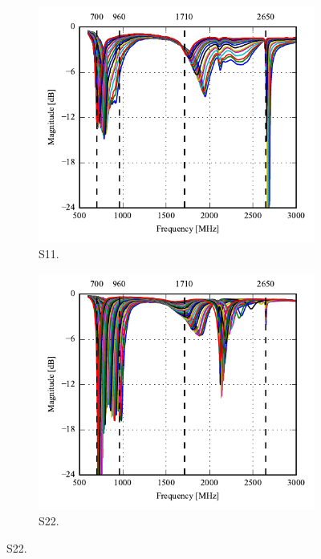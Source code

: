 \begin{figure}[htbp]
    \centering
    \begin{subfigure}{0.49\linewidth}
        \includegraphics{img/tech_sol/monopole/highband/meas/tuner/S11.pdf}
        \caption{S11.}
    \end{subfigure}
    \hfill
    \begin{subfigure}{0.49\linewidth}
        \includegraphics{img/tech_sol/monopole/highband/meas/tuner/S22.pdf}
        \caption{S22.}

\end{subfigure}
\end{figure}
